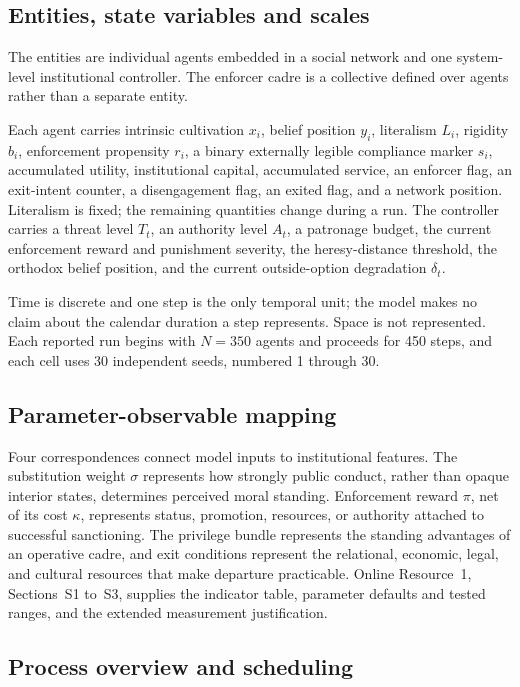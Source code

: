 \documentclass[12pt]{article}
\begin{document}
\subsection{Entities, state variables and scales}

The entities are individual agents embedded in a social network and one
system-level institutional controller. The enforcer cadre is a collective
defined over agents rather than a separate entity.

Each agent carries intrinsic cultivation \(x_i\), belief position \(y_i\),
literalism \(L_i\), rigidity \(b_i\), enforcement propensity \(r_i\), a binary
externally legible compliance marker \(s_i\), accumulated utility, institutional
capital, accumulated service, an enforcer flag, an exit-intent counter, a
disengagement flag, an exited flag, and a network position. Literalism is fixed;
the remaining quantities change during a run. The controller carries a threat
level \(T_t\), an authority level \(A_t\), a patronage budget, the current
enforcement reward and punishment severity, the heresy-distance threshold, the
orthodox belief position, and the current outside-option degradation
\(\delta_t\).

Time is discrete and one step is the only temporal unit; the model makes no
claim about the calendar duration a step represents. Space is not represented.
Each reported run begins with \(N=350\) agents and proceeds for 450 steps, and
each cell uses 30 independent seeds, numbered 1 through 30.

\subsection{Parameter-observable mapping}

Four correspondences connect model inputs to institutional features.
The substitution weight \(\sigma\) represents how strongly public conduct,
rather than opaque interior states, determines perceived moral standing.
Enforcement reward \(\pi\), net of its cost \(\kappa\), represents status,
promotion, resources, or authority attached to successful sanctioning. The
privilege bundle represents the standing advantages of an operative cadre, and
exit conditions represent the relational, economic, legal, and cultural
resources that make departure practicable. Online Resource~1, Sections~S1
to~S3, supplies the indicator table, parameter defaults and tested ranges, and
the extended measurement justification.

\subsection{Process overview and scheduling}
\end{document}
